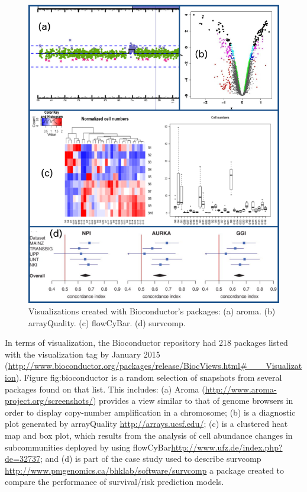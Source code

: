 \begin{figure}  
\centering
\includegraphics[width=\textwidth]{figures/bioconductor.png}
\caption[Visualizations created with Bioconductor's packages.]{Visualizations created with Bioconductor's packages: (a) aroma. (b) arrayQuality. (c) flowCyBar. (d) survcomp.
\label{fig:bioconductor}}
\end{figure}

In terms of visualization, the Bioconductor repository had 218 packages listed with the visualization tag by January 2015 (\url{http://www.bioconductor.org/packages/release/BiocViews.html#___Visualization}). Figure {fig:bioconductor} is a random selection of snapshots from several packages found on that list. This includes: (a) Aroma (\url{http://www.aroma-project.org/screenshots/}) provides a view similar to that of genome browsers in order to display copy-number amplification in a chromosome; (b) is a diagnostic plot generated by arrayQuality \url{http://arrays.ucsf.edu/}; (c) is a clustered heat map and box plot, which results from the analysis of cell abundance changes in subcommunities deployed by using flowCyBar\url{http://www.ufz.de/index.php?de=32737}; and (d) is part of the case study used to describe survcomp \url{http://www.pmgenomics.ca/bhklab/software/survcomp} a package created to compare the performance of survival/risk prediction models. 



